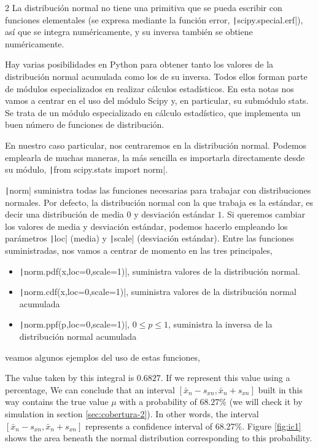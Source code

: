 \begin{paracol}{2}
La distribución normal no tiene una primitiva que se pueda escribir con funciones elementales (se expresa mediante la función error, \texttt|scipy.special.erf|), así que se integra numéricamente, y su inversa también se obtiene numéricamente. 

Hay varias posibilidades en Python para obtener tanto los valores de la distribución normal acumulada como los de su inversa. Todos ellos forman parte de módulos especializados en realizar cálculos estadísticos. En esta notas nos vamos a centrar en el uso del módulo Scipy y, en particular, su submódulo stats. Se trata de un módulo especializado en cálculo estadístico, que implementa un buen número de funciones de distribución. 

En nuestro caso particular, nos centraremos en la distribución normal. Podemos emplearla de muchas maneras, la más sencilla es importarla directamente desde su módulo, \texttt|from scipy.stats import norm|.

\texttt|norm| suministra todas las funciones necesarias para trabajar con distribuciones normales. Por defecto, la distribución normal con la que trabaja es la estándar, es decir una distribución de media $0$ y desviación estándar $1$. Si queremos cambiar los valores de media y desviación estándar, podemos hacerlo empleando los parámetros \texttt|loc| (media) y \texttt|scale| (desviación estándar). Entre las funciones suministradas, nos vamos a centrar de momento en las tres principales, 
\begin{itemize}
	\item \texttt|norm.pdf(x,loc=0,scale=1)|, suministra valores de la distribución normal.
	\item \texttt|norm.cdf(x,loc=0,scale=1)|, suministra valores de la distribución normal acumulada
	\item \texttt|norm.ppf(p,loc=0,scale=1)|, $0\leq p \leq 1$, suministra la inversa de la distribución normal acumulada
\end{itemize}
veamos algunos ejemplos del uso de estas funciones,

\switchcolumn
The value taken by this integral is $0.6827$. If we represent this value using a percentage, We can conclude that an interval $[\bar{x}_n-s_{xn}, \bar{x}_n+s_{xn}]$ built in this way contains the true value $\mu$ with a probability of $68.27\%$ (we will check it by simulation in section \ref{sec:cobertura-2}). In other words, the interval $[\bar{x}_n-s_{xn}, \bar{x}_n+s_{xn}]$ represents a confidence interval  of 68.27\%. Figure \ref{fig:ic1} shows the area beneath the normal distribution corresponding to this probability.


\end{paracol}
